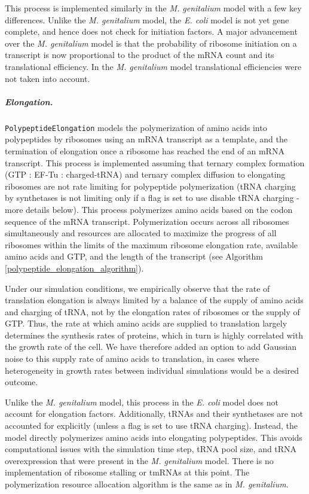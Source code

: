 \documentclass[12pt]{article}
\begin{document}
This process is implemented similarly in the \emph{M. genitalium} model with a few key differences. Unlike the \emph{M. genitalium} model, the \emph{E. coli} model is not yet gene complete, and hence does not check for initiation factors. A major advancement over the \emph{M. genitalium} model is that the probability of ribosome initiation on a transcript is now proportional to the product of the mRNA count and its translational efficiency. In the \emph{M. genitalium} model translational efficiencies were not taken into account.

\subparagraph{Elongation.}
\texttt{PolypeptideElongation} models the polymerization of amino acids into polypeptides by ribosomes using an mRNA transcript as a template, and the termination of elongation once a ribosome has reached the end of an mRNA transcript. This process is implemented assuming that ternary complex formation (GTP : EF-Tu : charged-tRNA) and ternary complex diffusion to elongating ribosomes are not rate limiting for polypeptide polymerization (tRNA charging by synthetases is not limiting only if a flag is set to use disable tRNA charging - more details below). This process polymerizes amino acids based on the codon sequence of the mRNA transcript. Polymerization occurs across all ribosomes simultaneously and resources are allocated to maximize the progress of all ribosomes within the limits of the maximum ribosome elongation rate, available amino acids and GTP, and the length of the transcript (see Algorithm \ref{polypeptide_elongation_algorithm}).

Under our simulation conditions, we empirically observe that the rate of translation elongation is always limited by a balance of the supply of amino acids and charging of tRNA, not by the elongation rates of ribosomes or the supply of GTP. Thus, the rate at which amino acids are supplied to translation largely determines the synthesis rates of proteins, which in turn is highly correlated with the growth rate of the cell. We have therefore added an option to add Gaussian noise to this supply rate of amino acids to translation, in cases where heterogeneity in growth rates between individual simulations would be a desired outcome.

Unlike the \emph{M. genitalium} model, this process in the \emph{E. coli} model does not account for elongation factors. Additionally, tRNAs and their synthetases are not accounted for explicitly (unless a flag is set to use tRNA charging). Instead, the model directly polymerizes amino acids into elongating polypeptides. This avoids computational issues with the simulation time step, tRNA pool size, and tRNA overexpression that were present in the \emph{M. genitalium} model. There is no implementation of ribosome stalling or tmRNAs at this point. The polymerization resource allocation algorithm is the same as in \emph{M. genitalium}.\\
\end{document}

